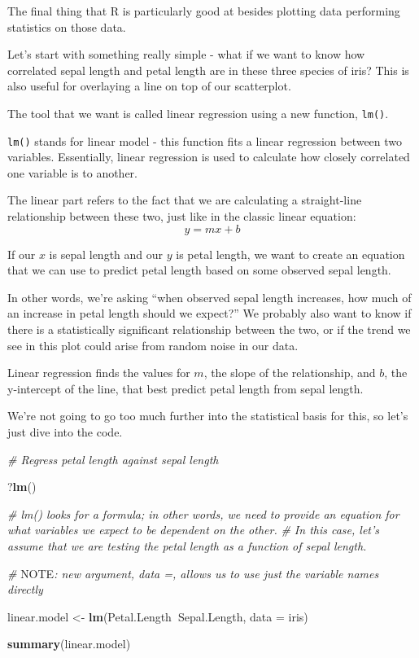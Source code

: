 \documentclass[]{article}
\newenvironment{Shaded}{\begin{snugshade}}{\end{snugshade}}
\newcommand{\KeywordTok}[1]{\textcolor[rgb]{0.13,0.29,0.53}{\textbf{#1}}}
\newcommand{\DataTypeTok}[1]{\textcolor[rgb]{0.13,0.29,0.53}{#1}}
\newcommand{\StringTok}[1]{\textcolor[rgb]{0.31,0.60,0.02}{#1}}
\newcommand{\CommentTok}[1]{\textcolor[rgb]{0.56,0.35,0.01}{\textit{#1}}}
\newcommand{\OperatorTok}[1]{\textcolor[rgb]{0.81,0.36,0.00}{\textbf{#1}}}
\newcommand{\AlertTok}[1]{\textcolor[rgb]{0.94,0.16,0.16}{#1}}
\newcommand{\NormalTok}[1]{#1}
\begin{document}
The final thing that R is particularly good at besides plotting data
performing statistics on those data.

Let's start with something really simple - what if we want to know how
correlated sepal length and petal length are in these three species of
iris? This is also useful for overlaying a line on top of our
scatterplot.

The tool that we want is called linear regression using a new function,
\texttt{lm()}.

\texttt{lm()} stands for linear model - this function fits a linear
regression between two variables. Essentially, linear regression is used
to calculate how closely correlated one variable is to another.

The linear part refers to the fact that we are calculating a
straight-line relationship between these two, just like in the classic
linear equation: \[ y = mx+b\]

If our \(x\) is sepal length and our \(y\) is petal length, we want to
create an equation that we can use to predict petal length based on some
observed sepal length.

In other words, we're asking ``when observed sepal length increases, how
much of an increase in petal length should we expect?'' We probably also
want to know if there is a statistically significant relationship
between the two, or if the trend we see in this plot could arise from
random noise in our data.

Linear regression finds the values for \(m\), the slope of the
relationship, and \(b\), the y-intercept of the line, that best predict
petal length from sepal length.

We're not going to go too much further into the statistical basis for
this, so let's just dive into the code.

\begin{Shaded}
\begin{Highlighting}[]
\CommentTok{# Regress petal length against sepal length}

\NormalTok{?}\KeywordTok{lm}\NormalTok{()}

\CommentTok{# lm() looks for a formula; in other words, we need to provide an equation for what variables we expect to be dependent on the other. }
\CommentTok{# In this case, let's assume that we are testing the petal length as a function of sepal length. }

\CommentTok{# }\AlertTok{NOTE}\CommentTok{: new argument, data =, allows us to use just the variable names directly}

\NormalTok{linear.model <-}\StringTok{ }\KeywordTok{lm}\NormalTok{(Petal.Length}\OperatorTok{~}\NormalTok{Sepal.Length,}
   \DataTypeTok{data =}\NormalTok{ iris)}

\KeywordTok{summary}\NormalTok{(linear.model)}
\end{Highlighting}
\end{Shaded}
\end{document}
